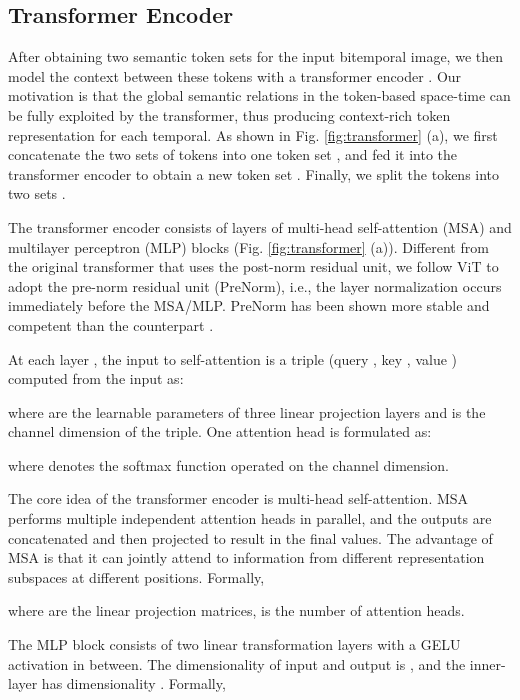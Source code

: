 \documentclass[journal]{IEEEtran}
\begin{document}
\subsection{Transformer Encoder}
\label{ssec:transformer_encoder}

After obtaining two semantic token sets  for the input bitemporal image, we then model the context between these tokens with a transformer encoder \cite{Vaswani2017}. Our motivation is that the global semantic relations in the token-based space-time can be fully exploited by the transformer, thus producing context-rich token representation for each temporal. As shown in Fig. \ref{fig:transformer} (a), we first concatenate the two sets of tokens into one token set , and fed it into the transformer encoder to obtain a new token set . Finally, we split the tokens into two sets .

 The transformer encoder consists of  layers of multi-head self-attention (MSA) and multilayer perceptron (MLP) blocks (Fig. \ref{fig:transformer} (a)). Different from the original transformer that uses the post-norm residual unit, we follow ViT \cite{Dosovitskiy2020} to adopt the pre-norm residual unit (PreNorm), i.e., the layer normalization occurs immediately before the MSA/MLP. PreNorm has been shown more stable and competent than the counterpart \cite{Nguyen2019}. 
 
 At each layer , the input to self-attention is a triple (query , key , value ) computed from the input  as:

 where  are the learnable parameters of three linear projection layers and  is the channel dimension of the triple. One attention head is formulated as:
 
where  denotes the softmax function operated on the channel dimension. 

The core idea of the transformer encoder is multi-head self-attention. MSA performs multiple independent attention heads in parallel, and the outputs are concatenated and then projected to result in the final values. The advantage of MSA is that it can jointly attend to information from different representation subspaces at different positions. Formally, 

where  are the linear projection matrices,  is the number of attention heads.

The MLP block consists of two linear transformation layers with a GELU \cite{Hendrycks2016} activation in between. The dimensionality of input and output is , and the inner-layer has dimensionality . Formally, 
\end{document}
